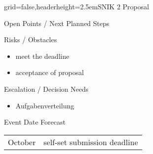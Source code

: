 \documentclass[english]{kiesgrube}
\begin{document}
\begin{poster}{grid=false,headerheight=2.5em}{}{SNIK 2 Proposal}{}{}
\begin{posterbox}[name=open,column=1,below=description]{Open Points / Next Planned Steps}
\begin{enumerate}
\end{enumerate}
\end{posterbox}
\begin{posterbox}[name=risks,column=1,below=open]{Risks / Obstacles}
\begin{itemize}
\item meet the deadline
\item acceptance of proposal 
\end{itemize}
\end{posterbox}
\begin{posterbox}[name=escalation,column=1,below=risks]{Escalation / Decision Needs}
\begin{itemize}
\item Aufgabenverteilung 
\end{itemize}
\end{posterbox}
\begin{posterbox}[name=event,below=progress,]{Event Date Forecast}
\begin{tabulary}{\textwidth}{lL}
October		&self-set submission deadline
\end{tabulary}
\end{posterbox}


\end{poster}
\end{document}
